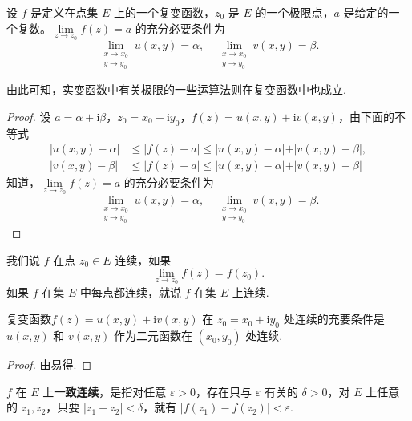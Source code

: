 \documentclass[../../main.tex]{subfiles}
\begin{document}
\begin{theorem}\label{theorem:复变函数极限存在充要条件1.7}
设 $f$ 是定义在点集 $E$ 上的一个复变函数，$z_0$ 是 $E$ 的一个极限点，$a$ 是给定的一个复数。$\lim\limits_{z \to z_0} f(z) = a$ 的充分必要条件为
\[
\lim_{\substack{x \to x_0 \\ y \to y_0}} u(x, y) = \alpha, \quad \lim_{\substack{x \to x_0 \\ y \to y_0}} v(x, y) = \beta.
\]
\end{theorem}
\begin{note}
由此可知，实变函数中有关极限的一些运算法则在复变函数中也成立.
\end{note}
\begin{proof}
设 $a = \alpha + \mathrm{i}\beta$，$z_0 = x_0 + \mathrm{i}y_0$，$f(z) = u(x, y) + \mathrm{i}v(x, y)$，由下面的不等式
\begin{align*}
\vert u(x, y) - \alpha \vert &\leqslant \vert f(z) - a \vert \leqslant \vert u(x, y) - \alpha \vert + \vert v(x, y) - \beta \vert, \\
\vert v(x, y) - \beta \vert &\leqslant \vert f(z) - a \vert \leqslant \vert u(x, y) - \alpha \vert + \vert v(x, y) - \beta \vert 
\end{align*}
知道，$\lim\limits_{z \to z_0} f(z) = a$ 的充分必要条件为
\[
\lim_{\substack{x \to x_0 \\ y \to y_0}} u(x, y) = \alpha, \quad \lim_{\substack{x \to x_0 \\ y \to y_0}} v(x, y) = \beta.
\]

\end{proof}

\begin{definition}
我们说 $f$ 在点 $z_0 \in E$ 连续，如果
\[
\lim_{z \to z_0} f(z) = f(z_0).
\]
如果 $f$ 在集 $E$ 中每点都连续，就说 $f$ 在集 $E$ 上连续.
\end{definition}

\begin{theorem}
复变函数$f(z) = u(x, y) + \mathrm{i}v(x, y)$ 在 $z_0 = x_0 + \mathrm{i}y_0$ 处连续的充要条件是 $u(x, y)$ 和 $v(x, y)$ 作为二元函数在 $(x_0, y_0)$ 处连续.
\end{theorem}
\begin{proof}
由易得.

\end{proof}

\begin{definition}
$f$ 在 $E$ 上\textbf{一致连续}，是指对任意 $\varepsilon > 0$，存在只与 $\varepsilon$ 有关的 $\delta > 0$，对 $E$ 上任意的 $z_1, z_2$，只要 $|z_1 - z_2| < \delta$，就有 $|f(z_1) - f(z_2)| < \varepsilon$.
\end{definition}
\end{document}
